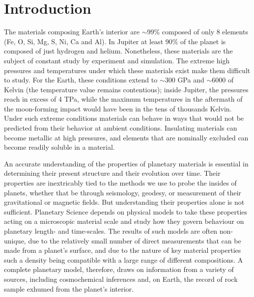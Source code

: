 \chapter{Introduction}\label{chap1}

The materials composing Earth's interior are $\sim$99\% composed of only 8 elements (Fe,
O, Si, Mg, S, Ni, Ca and Al). In Jupiter at least 90\% of the planet is composed
of just hydrogen and helium.  Nonetheless, these materials are the subject of
constant study by experiment and simulation. The extreme high pressures and
temperatures under which these materials exist make them difficult to study.
For the Earth, these conditions extend to $\sim$300 GPa and $\sim$6000 of Kelvin
\citep{alfe2009} (the temperature value remains contentious); inside Jupiter,
the pressures reach in excess of 4 TPa, while the maximum temperatures in the
aftermath of the moon-forming impact would  have been in the tens of thousands
Kelvin. Under such extreme conditions materials can behave in ways that would
not be predicted from their behavior at ambient conditions. Insulating
materials can become metallic at high pressures, and elements that are
nominally excluded can become readily soluble in a material.

An accurate understanding of the properties of planetary materials is essential
in determining their present structure and their evolution over time. Their
properties are inextricably tied to the methods we use to probe the insides of
planets, whether that be through seismology, geodesy, or measurement of their
gravitational or magnetic fields. But understanding their properties alone is
not sufficient. Planetary Science depends on physical models to take these
properties acting on a microscopic material scale and study how they govern
behaviour on planetary length- and time-scales. The results of such models are
often non-unique, due to the relatively small number of direct measurements
that can be made from a planet's surface, and due to the nature of key material
properties such a density  being compatible with a large range of different
compositions. A complete planetary model, therefore, draws on information from a
variety of sources, including cosmochemical inferences and, on Earth, the
record of rock sample exhumed from the planet's interior.

